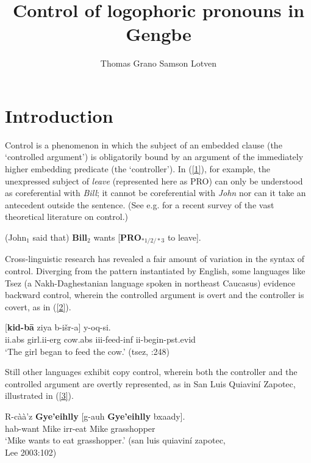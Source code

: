 \documentclass[output=paper
,modfonts
,nonflat]{langsci/langscibook}
\title{Control of logophoric pronouns in Gengbe}
\author{%
 Thomas Grano\affiliation{Indiana University}\lastand 
 Samson Lotven\affiliation{Indiana University} 
}
\newcommand{\á}{\'{ã}}
\newcommand{\É}{\'{\~{ε}}}
\newcommand{\È}{\`{\~{ε}}}
\newcommand{\í}{\'{\~{i}}}
\newcommand{\ì}{\`{\~{i}}}
\newcommand{\Ó}{\'{\~{ɔ}}}
\newcommand{\Ò}{\`{\~{ɔ}}}
\newcommand{\ú}{\'{ũ}}
\newcommand{\ù}{\`{ũ}}
\begin{document}
\maketitle
\section{Introduction} 






Control is a phenomenon in which the subject of an embedded clause (the `controlled argument') is obligatorily bound by an argument of the immediately higher embedding predicate (the `controller'). In (\ref{1}), for example, the unexpressed subject of {\em leave} (represented here as PRO) can only be understood as coreferential with {\em Bill}; it cannot be coreferential with {\em John} nor can it take an antecedent outside the sentence. (See e.g. \citealt{landau13} for a recent survey of the vast theoretical literature on control.)

\ea (John$_{1}$ said that) {\bf Bill$_{2}$} wants [{\bf PRO}$_{*1/2/*3}$ to leave]. \label{1}
\z

Cross-linguistic research has revealed a fair amount of variation in the syntax of control. Diverging from the pattern instantiated by English, some languages like Tsez (a Nakh-Daghestanian language spoken in northeast Caucasus) evidence {\sc backward control}, wherein the controlled argument is overt and the controller is covert, as in (\ref{2}).

\ea
\gll {\bf $\emptyset$} [{\bf kid-b\={a}} ziya b-i\v{s}r-a] y-oq-si.\\
{\sc ii}.{\sc abs} girl.{\sc ii}-{\sc erg} cow.{\sc abs} {\sc iii}-feed-{\sc inf} {\sc ii}-begin-{\sc pst}.{\sc evid}\\
\glt `The girl began to feed the cow.' \hfill ({\sc tsez}, \citealt{pp02}:248) \label{2}
\z

Still other languages exhibit {\sc copy control}, wherein both the controller and the controlled argument are overtly represented, as in San Luis Quiavin\'i Zapotec, illustrated in (\ref{3}).

\ea
\gll R-c\`a\`a'z {\bf Gye'eihlly} [g-auh {\bf Gye'eihlly} bxaady].\\
{\sc hab}-want Mike {\sc irr}-eat Mike grasshopper\\
\glt `Mike wants to eat grasshopper.' \hfill({\sc san luis quiavin\'i zapotec},\\ \vspace{-.5cm} \null\hspace{9.36cm} Lee 2003:102) \label{3}
\z
\end{document}
